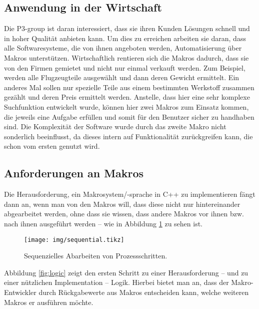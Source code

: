   \subsection{Anwendung in der Wirtschaft}
  \label{ssec:anwendung_in_der_wirtschaft}
    Die P3-group ist daran interessiert, dass sie ihren Kunden Lösungen schnell und in hoher Qualität anbieten kann. Um dies zu erreichen arbeiten sie daran, dass alle Softwaresysteme, die von ihnen angeboten werden, Automatisierung über Makros unterstützen. Wirtschaftlich rentieren sich die Makros dadurch, dass sie von den Firmen gemietet und nicht nur einmal verkauft werden. Zum Beispiel, werden alle Flugzeugteile ausgewählt und dann deren Gewicht ermittelt. Ein anderes Mal sollen nur spezielle Teile aus einem bestimmten Werkstoff zusammen gezählt und deren Preis ermittelt werden. Anstelle, dass hier eine sehr komplexe Suchfunktion entwickelt wurde, können hier zwei Makros zum Einsatz kommen, die jeweils eine Aufgabe erfüllen und somit für den Benutzer sicher zu handhaben sind. Die Komplexität der Software wurde durch das zweite Makro nicht sonderlich beeinflusst, da dieses intern auf Funktionalität zurückgreifen kann, die schon vom ersten genutzt wird.

  \subsection{Anforderungen an Makros}
  \label{ssec:anforderungen_an_macros}
    Die Herausforderung, ein Makrosystem/-sprache in C++ zu implementieren fängt dann an, wenn man von den Makros will, dass diese nicht nur hintereinander abgearbeitet werden, ohne dass sie wissen, dass andere Makros vor ihnen bzw. nach ihnen ausgeführt werden -- wie in Abbildung \ref{fig:sequential} zu sehen ist.

    \begin{figure}[H]
      \centering
      \texttt{[image: img/sequential.tikz]}
      \caption{Sequenzielles Abarbeiten von Prozessschritten.}
      \label{fig:sequential}
    \end{figure}

    Abbildung \ref{fig:logic} zeigt den ersten Schritt zu einer Herausforderung -- und zu einer nützlichen Implementation -- Logik. Hierbei bietet man an, dass der Makro-Entwickler durch Rückgabewerte aus Makros entscheiden kann, welche weiteren Makros er ausführen möchte.


